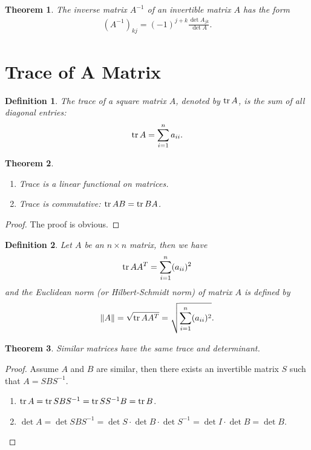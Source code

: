 \documentclass[11pt]{book}
\newtheorem{definition}{Definition}[section]
\newtheorem{theorem}{Theorem}[section]
\theoremstyle{definition}
\numberwithin{equation}{subsection}
\begin{document}
\begin{theorem}
The inverse matrix $A^{-1}$ of an invertible matrix $A$ has the form
\begin{align*}
    \left(A^{-1}\right)_{kj} = (-1)^{j+k} \frac{\det A_{jk}}{\det A}.
\end{align*}
\end{theorem}

\medskip

\section{Trace of A Matrix}
\begin{definition}
The trace of a square matrix $A$, denoted by $\tr A$, is the sum of all diagonal entries:
\begin{align*}
    \tr A = \sum^n_{i=1} a_{ii}.
\end{align*}
\end{definition}

\medskip

\begin{theorem}
~\begin{enumerate}[label=(\roman*)]
    \item Trace is a linear functional on matrices.
    \item Trace is commutative: $\tr AB = \tr BA$.
\end{enumerate}
\end{theorem}
\begin{proof}
The proof is obvious.
\end{proof}

\medskip

\begin{definition}
Let $A$ be an $n\times n$ matrix, then we have 
\begin{align*}
    \tr AA^T = \sum^n_{i=1}(a_{ii})^2
\end{align*}
and the Euclidean norm (or Hilbert-Schmidt norm) of matrix $A$ is defined by \begin{align*}
    \|A\| = \sqrt{\tr AA^T} = \sqrt{\sum^n_{i=1}(a_{ii})^2}.
\end{align*}
\end{definition}

\medskip

\begin{theorem}
Similar matrices have the same trace and determinant.
\end{theorem}
\begin{proof}
Assume $A$ and $B$ are similar, then there exists an invertible matrix $S$ such that $A = SBS^{-1}$.
\begin{enumerate}[label=(\arabic*)]
    \item $\tr A = \tr SBS^{-1} =\tr SS^{-1}B = \tr B$.
    \item $\det A = \det SBS^{-1} = \det S\cdot \det B \cdot \det S^{-1} = \det I\cdot \det B = \det B$.
\end{enumerate}
\end{proof}
\end{document}
